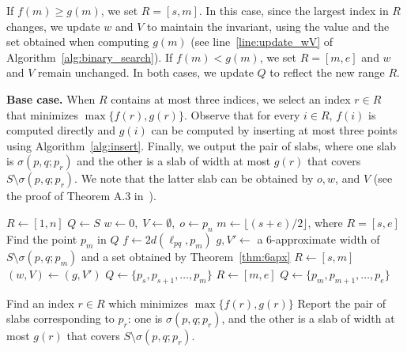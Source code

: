 \documentclass[10pt,a4paper]{article}
\theoremstyle{star}
\theoremstyle{claimstar}
\begin{document}
If $f(m) \ge g(m)$, we set $R = [s, m]$.
In this case, since the largest index in $R$ changes, we update $w$ and $V$ to maintain the invariant, using the value and the set obtained when computing $g(m)$ (see line~\ref{line:update_wV} of Algorithm~\ref{alg:binary_search}).
If $f(m) < g(m)$, we set $R = [m, e]$ and $w$ and $V$ remain unchanged.
In both cases, we update $Q$ to reflect the new range $R$.

\textbf{Base case.} When $R$ contains at most three indices, we select an index $r \in R$ that minimizes $\max \{ f(r), g(r) \}$.
Observe that for every $i\in R$, $f(i)$ is computed directly and $g(i)$ can be computed by inserting at most three points using Algorithm~\ref{alg:insert}. 
Finally, we output the pair of slabs, where one slab is $\sigma(p, q; p_r)$ and the other is a slab of width at most $g(r)$ that covers $S \setminus \sigma(p, q; p_r)$. 
We note that the latter slab can be obtained by $o, w$, and $V$ (see the proof of Theorem A.3 in~\cite{chan2006faster}).



\begin{algorithm}
\caption{A linear-time $10$-approximation algorithm}
\label{alg:binary_search}
\begin{algorithmic}[1]
\State $R \gets [1, n]$
\State $Q \gets S$
\State $w \gets 0, \; V \gets \emptyset, \; o \gets p_n$ 
    \State $m\gets \lfloor (s + e)/2 \rfloor$, where $R = [s, e]$
    \State Find the point $p_{m}$ in $Q$
    \State $f \gets 2d(\ell_{pq}, p_{m})$ \label{line:f}
    \State $g, V' \gets $ a $6$-approximate width of $S\setminus \sigma(p,q;p_{m})$ and a set obtained by Theorem~\ref{thm:6apx}\label{line:g}
     \label{line:bs_condition}
        \State $R \gets [s, m]$ \label{line:if_R}
        \State $(w, V)\gets (g, V')$ \label{line:update_wV}
        \State $Q \gets \{p_{s}, p_{s +1}, \ldots, p_{m} \}$ \label{line:if_Q}
    \Else
        \State $R \gets [m, e]$ \label{line:else_R}
        \State $Q \gets \{p_{m}, p_{m +1}, \ldots, p_{e} \}$ \label{line:else_Q}
        
    \EndIf
\EndWhile

\State Find an index $r\in R$ which minimizes $\max\{f(r), g(r)\}$\label{line:final_index} \label{line:final_R}
\State Report the pair of slabs corresponding to $p_r$: one is $\sigma(p, q; p_r)$, and the other is a slab of width at most $g(r)$ that covers $S \setminus \sigma(p, q; p_r)$.

\end{algorithmic}
\end{algorithm}
\end{document}
